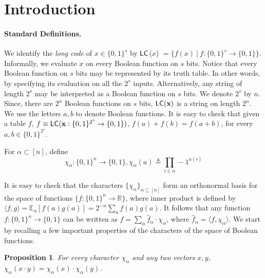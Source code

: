 \documentclass[11pt]{article}
\newtheorem{proposition}[theorem]{Proposition}
\newcommand{\eat}[1]{}
\newcommand{\LC}{{\sf LC}}
\begin{document}
\eat{\begin{abstract}
  The goal of this note is to understand the soundness of a certain variant
of tensored tests of H{\aa}stad's Long Code Test.
\end{abstract}
}
\section{Introduction}


\paragraph{Standard Definitions.} We identify the {\em long code} of
${x} \in \{0,1\}^s$ by $\LC$({$x$}) $= \{ f({x})\ |\ f :
\{0,1\}^s \rightarrow \{0, 1\} \}$. Informally, we evaluate {$x$} on
every Boolean function on $s$ bits. Notice that every Boolean function
on $s$ bits may be represented by its truth table. In other words, by
specifying its evaluation on all the $2^s$ inputs. Alternatively, any
string of length $2^s$ may be interpreted as a Boolean function on $s$
bits. We denote $2^s$ by $n$. Since, there are $2^{n}$ Boolean
functions on $s$ bits, $\LC({\bf x})$ is a string on length
$2^{n}$. We use the letters $a, b$ to denote Boolean functions. It is
easy to check that given a table $f$, $ f \equiv \LC({\bf x} : \{0,
1\}^{2^s} \rightarrow \{0,1\})$, $f(a) + f(b) = f(a + b)$, for every
$a,b \in \{0,1\}^{2^s}$.

For $\alpha \subset [n]$, define
\[
          \chi_\alpha : \{0, 1\}^n \rightarrow \{0, 1\},  \chi_\alpha(a) \triangleq \prod_{i\in \alpha}-1^{a(i)}
\]

It is easy to check that the characters $\{\chi_\alpha\}_{\alpha
  \subseteq [n]}$ form an orthonormal basis for the space of functions
$\{f : \{0, 1\}^n \rightarrow \mathbb{R}\}$, where inner product is
defined by $\langle f, g \rangle = \mathbb{E}_a[f(a) g(a)] =
2^{-n}\sum_a f(a)g(a)$. It follows that any function $f: \{0,1\}^n
\rightarrow \{0,1\}$ can be written as $f = \sum_\alpha
\hat{f}_\alpha \cdot \chi_\alpha$, where $\hat{f}_\alpha =\langle
f,\chi_\alpha \rangle$. We start by recalling a few important
properties of the characters of the space of Boolean functions.

\begin{proposition} \label{decompose}
For every character $\chi_\alpha$ and any two vectors $x,y$, $\chi_\alpha(x\cdot y) = \chi_\alpha(x) \cdot \chi_\alpha(y)$.
\end{proposition}
\end{document}
